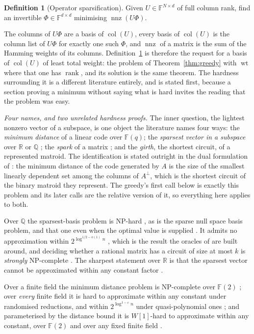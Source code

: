 \documentclass[11pt,reqno]{amsart}
\theoremstyle{plain}
\theoremstyle{definition}
\newtheorem{definition}[theorem]{Definition}
\theoremstyle{remark}
\newcommand{\GF}{\mathbb{F}}
\newcommand{\rk}{\operatorname{rank}}
\newcommand{\nnz}{\operatorname{nnz}}
\newcommand{\wt}{\operatorname{wt}}
\newcommand{\col}{\operatorname{col}}
\begin{document}
\begin{definition}[Operator sparsification]\label{def:sparsify}
Given $U\in\GF^{N\times d}$ of full column rank, find an invertible
$\Phi\in\GF^{d\times d}$ minimising $\nnz(U\Phi)$.
\end{definition}

The columns of $U\Phi$ are a basis of $\col(U)$, every basis of $\col(U)$ is the
column list of $U\Phi$ for exactly one such $\Phi$, and $\nnz$ of a matrix is the
sum of the Hamming weights of its columns. Definition~\ref{def:sparsify} is
therefore the request for a basis of $\col(U)$ of least total weight: the problem
of Theorem~\ref{thm:greedy} with $\wt$ where that one has $\rk$, and its solution
is the same theorem. The hardness surrounding it is a different literature
entirely, and is stated first, because a section proving a minimum without
saying what is hard invites the reading that the problem was easy.

\emph{Four names, and two unrelated hardness proofs.} The inner question, the
lightest nonzero vector of a subspace, is one object the literature names four
ways: the \emph{minimum distance} of a linear code over $\GF(q)$; the
\emph{sparsest vector in a subspace} over $\mathbb{R}$ or $\mathbb{Q}$
\cite{qu2020}; the \emph{spark} of a matrix \cite{tillmann2014}; and
the \emph{girth}, the shortest circuit, of a represented matroid. The
identification is stated outright in the dual formulation of
\cite{bhattacharyya2021}: the minimum distance of the code generated by $A$ is
the size of the smallest linearly dependent set among the columns of $A^{\perp}$,
which is the shortest circuit of the binary matroid they represent. The greedy's
first call below is exactly this problem and its later calls are the relative
version of it, so everything here applies to both.

Over $\mathbb{Q}$ the sparsest-basis problem is NP-hard \cite{mccormick1983}, as
is the sparse null space basis problem, and that one even when the optimal value
is supplied \cite{colemanpothen1986}. It admits no approximation within
$2^{\log^{1/2-o(1)} n}$ \cite{gottlieb2010}, which is the result the oracles of
\cite{beniamini2020} are built around, and deciding whether a rational matrix has
a circuit of size at most $k$ is \emph{strongly} NP-complete \cite{tillmann2014}.
The sharpest statement over $\mathbb{R}$ is that the sparsest vector cannot be
approximated within any constant factor \cite{sparsevectorfocs2025}.

Over a finite field the minimum distance problem is NP-complete over $\GF(2)$
\cite{vardy1997}; over \emph{every} finite field it is hard to approximate within
any constant under randomised reductions, and within
$2^{\log^{1-\varepsilon} n}$ under quasi-polynomial ones \cite{dumer2003}; and
parameterised by the distance bound it is
$W[1]$-hard to approximate within any constant, over $\GF(2)$
\cite{bhattacharyya2021} and over any fixed finite field \cite{bennett2023}.
\end{document}

